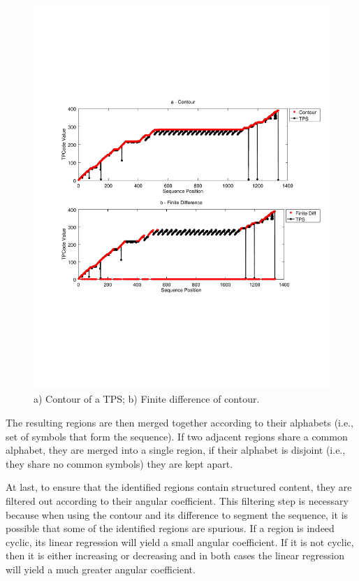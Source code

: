 \documentclass{vldb}
\begin{document}
\begin{figure}[h]
  \centering
     \includegraphics[trim={2.5cm 7.5cm 1cm 6.5cm}, width=\linewidth
     ]{img/contour.pdf}
  \caption{a) Contour of a TPS; b) Finite difference of contour.}
  \label{fig:contour}
\end{figure}

The resulting regions are then merged together according to their alphabets
(i.e., set of symbols that form the sequence). If two adjacent regions share a
common alphabet, they are merged into a single region, if their alphabet is
disjoint (i.e., they share no common symbols) they are kept apart.

At last, to ensure that the identified regions contain structured content, they
are filtered out according to their angular coefficient. This filtering step is
necessary because when using the contour and its difference to segment the
sequence, it is possible that some of the identified regions are spurious. If a
region is indeed cyclic, its linear regression will yield a small angular
coefficient. If it is not cyclic, then it is either increasing or decreasing and
in both cases the linear regression will yield a much greater angular
coefficient.
\end{document}
